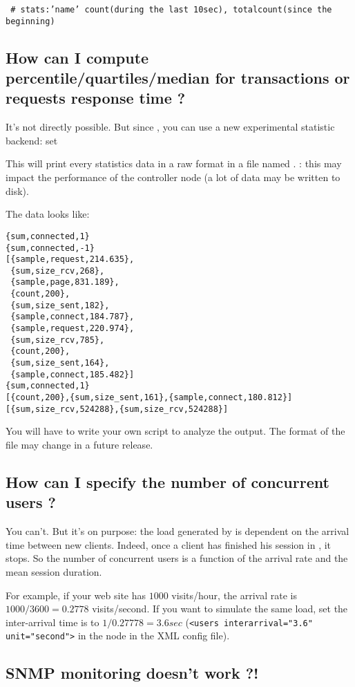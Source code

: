 \documentclass{IDXDOC-en}
\begin{document}
\begin{appendix}
\texttt{ \# stats:'name' count(during the last 10sec), totalcount(since the beginning)}

\subsection{How can I compute percentile/quartiles/median for transactions or requests
  response time ?}

It's not directly possible. But since , you can
use a new experimental statistic backend: set 

This will print every statistics data in a raw format in a file named
. : this may impact the performance of
the controller node (a lot of data may be written to disk).

The data looks like:
\begin{Verbatim}
{sum,connected,1}
{sum,connected,-1}
[{sample,request,214.635},
 {sum,size_rcv,268},
 {sample,page,831.189},
 {count,200},
 {sum,size_sent,182},
 {sample,connect,184.787},
 {sample,request,220.974},
 {sum,size_rcv,785},
 {count,200},
 {sum,size_sent,164},
 {sample,connect,185.482}]
{sum,connected,1}
[{count,200},{sum,size_sent,161},{sample,connect,180.812}]
[{sum,size_rcv,524288},{sum,size_rcv,524288}]
\end{Verbatim}

You will have to write your own script to analyze the output.
The format of the file may change in a future release.


\subsection{How can I specify the number of concurrent users ?}

You can't. But it's on purpose: the load generated by
 is dependent on the arrival time between new
clients. Indeed, once a client has finished his session in
, it stops. So the number of concurrent users is
a function of the arrival rate and the mean session duration.

For example, if your web site has $1000$ visits/hour, the arrival rate
is $1000/3600 = 0.2778$ visits/second. If you want to simulate the same
load, set the inter-arrival time is to $1/0.27778 = 3.6 sec$ (\texttt{<users
interarrival="3.6" unit="second">} in the  node in the
XML config file).

\subsection{SNMP monitoring doesn't work ?!}


\end{appendix}
\end{document}
